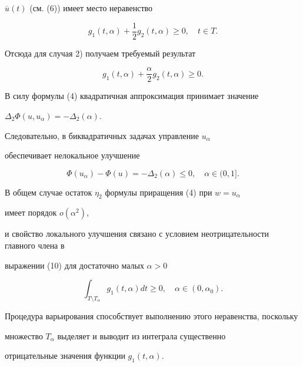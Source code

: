 $\overline{u}(t)$ (см. (6)) имеет место неравенство


$$


g_1(t,\alpha)+\frac{1}{2}g_2(t,\alpha)\geq 0,\quad t\in T.


$$


Отсюда для случая 2) получаем требуемый результат


\begin{equation}


g_1(t,\alpha)+\frac{\alpha}{2}g_2(t,\alpha)\geq 0.


\end{equation}





				 			 


В силу формулы (4) квадратичная аппроксимация принимает значение 


$\Delta_2\Phi(u,u_{\alpha})=-\Delta_2({\alpha})$.


Следовательно, в биквадратичных задачах управление $u_{\alpha}$ 


обеспечивает нелокальное улучшение


$$


\Phi(u_{\alpha})-\Phi(u)=-\Delta_2(\alpha)\leq 0,\quad \alpha\in (0,1].


$$


 


В общем случае остаток $\eta_2$ формулы приращения (4) при $w=u_{\alpha}$ 


имеет порядок $o(\alpha^2)$, 


и свойство локального улучшения связано с условием неотрицательности главного члена в 


выражении (10) для достаточно малых $\alpha>0$


\begin{equation}


\int_{T\setminus T_{\alpha}}g_1(t,\alpha)dt\geq 0,


\quad \alpha\in (0,\alpha_0).


\end{equation}


				 


Процедура варьирования способствует выполнению этого неравенства, поскольку 


множество $T_{\alpha}$ выделяет и выводит из интеграла существенно 


отрицательные значения функции $g_1(t,\alpha)$. 


